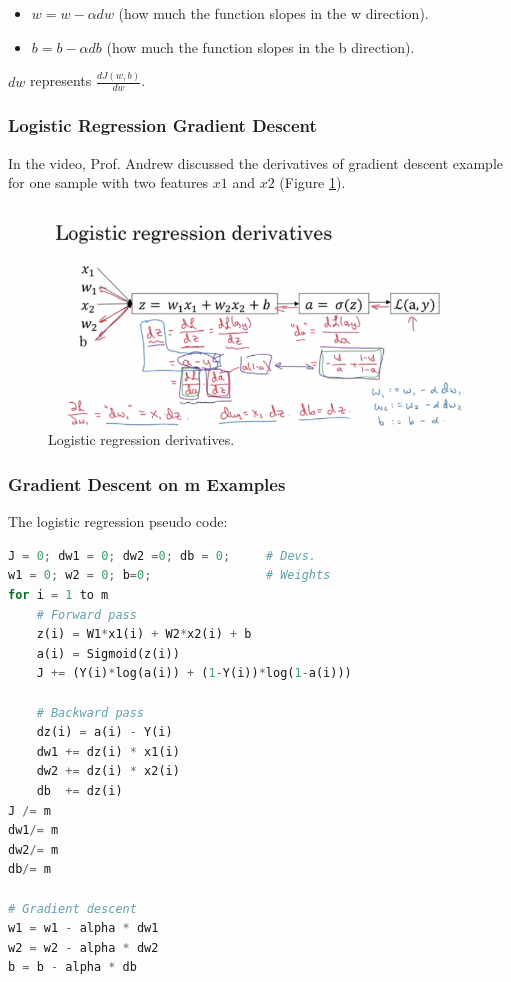 \begin{itemize}
    \item $w = w - \alpha dw$ (how much the function slopes in the w direction).
    \item $b = b - \alpha db$ (how much the function slopes in the b direction).
\end{itemize}

$dw$ represents $\frac{dJ(w,b)}{dw}$.

\subsubsection{Logistic Regression Gradient Descent}
In the video, Prof. Andrew discussed the derivatives of gradient descent example for one sample with two features $x1$ and $x2$ (Figure \ref{logistic-regression}).

\begin{figure}[!htbp]
    \centering
    \includegraphics[width=1.0\textwidth, trim={0 0 0 50}, clip]{img/c1/logistic-regression.png}
    \caption{Logistic regression derivatives.}
    \label{logistic-regression}
\end{figure}

\subsubsection{Gradient Descent on m Examples}
The logistic regression pseudo code:

\begin{lstlisting}[language=python]
J = 0; dw1 = 0; dw2 =0; db = 0;     # Devs.
w1 = 0; w2 = 0; b=0;				# Weights
for i = 1 to m
	# Forward pass
	z(i) = W1*x1(i) + W2*x2(i) + b
	a(i) = Sigmoid(z(i))
	J += (Y(i)*log(a(i)) + (1-Y(i))*log(1-a(i)))

	# Backward pass
	dz(i) = a(i) - Y(i)
	dw1 += dz(i) * x1(i)
	dw2 += dz(i) * x2(i)
	db  += dz(i)
J /= m
dw1/= m
dw2/= m
db/= m

# Gradient descent
w1 = w1 - alpha * dw1
w2 = w2 - alpha * dw2
b = b - alpha * db
\end{lstlisting}

